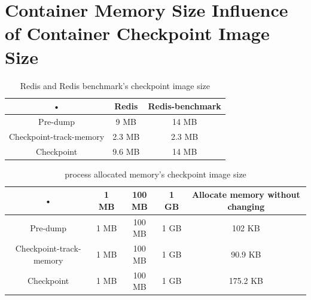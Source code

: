 \section{Container Memory Size Influence of Container Checkpoint Image Size}

\begin{table}[hbtp]
\begin{center}
\begin{tabular}{|c|c|c|}
\hline 
• & Redis & Redis-benchmark \\ 
\hline 
Pre-dump & 9 MB & 14 MB \\ 
\hline 
Checkpoint-track-memory & 2.3 MB & 2.3 MB \\ 
\hline 
Checkpoint & 9.6 MB & 14 MB \\ 
\hline 
\end{tabular}
\caption{Redis and Redis benchmark's checkpoint image size}
\end{center}
\end{table}

\begin{table}[hbtp]
\begin{center}
\begin{tabular}{|c|c|c|c|c|}\hline 
• & 1 MB & 100 MB & 1 GB & Allocate memory without changing\\ 
\hline 
Pre-dump & 1 MB & 100 MB & 1 GB & 102 KB\\ 
\hline 
Checkpoint-track-memory & 1 MB & 100 MB & 1 GB & 90.9 KB \\ 
\hline 
Checkpoint & 1 MB & 100 MB & 1 GB & 175.2 KB \\ 
\hline 
\end{tabular}
\caption{process allocated memory's checkpoint image size}
\end{center}
\end{table}